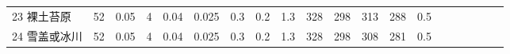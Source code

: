 \begin{landscape}
\begin{table}[htbp]
\begin{tabular}{@{}lccccccccccccccccccc@{}}
    23 裸土苔原    & 52                                                                & 0.05                                                                                                   & 4                                                                                  & 0.04                                                                               & 0.025                                                               & 0.3                                                       & 0.2                                                       & 1.3                                                       & 328                                                             & 298                                                             & 313                                                              & 288                                                               & 0.5                                                          \\
    24 雪盖或冰川   & 52                                                                & 0.05                                                                                                   & 4                                                                                  & 0.04                                                                               & 0.025                                                               & 0.3                                                       & 0.2                                                       & 1.3                                                       & 328                                                             & 298                                                             & 308                                                              & 281                                                               & 0.5                                                          \\\bottomrule
    \end{tabular}
\end{table}
\end{landscape}

